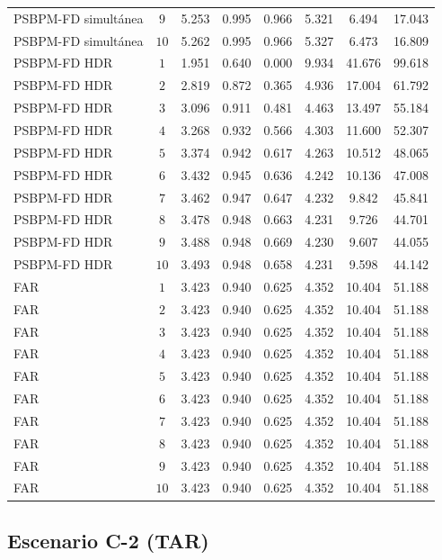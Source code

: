 \begin{table}[H]
\begin{tabular}{l c cccccc}
PSBPM-FD simultánea & $9$ & 5.253 & 0.995 & 0.966 & 5.321 & 6.494 & 17.043 \\
PSBPM-FD simultánea & $10$ & 5.262 & 0.995 & 0.966 & 5.327 & 6.473 & 16.809 \\
\hline
PSBPM-FD HDR & $1$ & 1.951 & 0.640 & 0.000 & 9.934 & 41.676 & 99.618 \\
PSBPM-FD HDR & $2$ & 2.819 & 0.872 & 0.365 & 4.936 & 17.004 & 61.792 \\
PSBPM-FD HDR & $3$ & 3.096 & 0.911 & 0.481 & 4.463 & 13.497 & 55.184 \\
PSBPM-FD HDR & $4$ & 3.268 & 0.932 & 0.566 & 4.303 & 11.600 & 52.307 \\
PSBPM-FD HDR & $5$ & 3.374 & 0.942 & 0.617 & 4.263 & 10.512 & 48.065 \\
PSBPM-FD HDR & $6$ & 3.432 & 0.945 & 0.636 & 4.242 & 10.136 & 47.008 \\
PSBPM-FD HDR & $7$ & 3.462 & 0.947 & 0.647 & 4.232 & 9.842 & 45.841 \\
PSBPM-FD HDR & $8$ & 3.478 & 0.948 & 0.663 & 4.231 & 9.726 & 44.701 \\
PSBPM-FD HDR & $9$ & 3.488 & 0.948 & 0.669 & 4.230 & 9.607 & 44.055 \\
PSBPM-FD HDR & $10$ & 3.493 & 0.948 & 0.658 & 4.231 & 9.598 & 44.142 \\
\hline
FAR & $1$ & 3.423 & 0.940 & 0.625 & 4.352 & 10.404 & 51.188 \\
FAR & $2$ & 3.423 & 0.940 & 0.625 & 4.352 & 10.404 & 51.188 \\
FAR & $3$ & 3.423 & 0.940 & 0.625 & 4.352 & 10.404 & 51.188 \\
FAR & $4$ & 3.423 & 0.940 & 0.625 & 4.352 & 10.404 & 51.188 \\
FAR & $5$ & 3.423 & 0.940 & 0.625 & 4.352 & 10.404 & 51.188 \\
FAR & $6$ & 3.423 & 0.940 & 0.625 & 4.352 & 10.404 & 51.188 \\
FAR & $7$ & 3.423 & 0.940 & 0.625 & 4.352 & 10.404 & 51.188 \\
FAR & $8$ & 3.423 & 0.940 & 0.625 & 4.352 & 10.404 & 51.188 \\
FAR & $9$ & 3.423 & 0.940 & 0.625 & 4.352 & 10.404 & 51.188 \\
FAR & $10$ & 3.423 & 0.940 & 0.625 & 4.352 & 10.404 & 51.188 \\
\hline
\end{tabular}
\end{table}

\subsection{Escenario C-2 (TAR)}
\label{aneB_00_01_01_metricas_tar}

